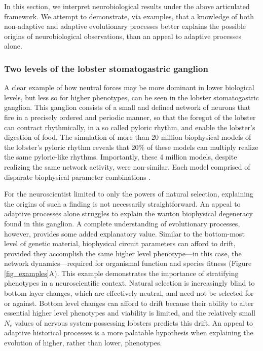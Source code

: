 \documentclass[twocolumn]{article}
\begin{document}
In this section, we interpret neurobiological results under the above articulated framework. We attempt to demonstrate, via examples, that a knowledge of both non-adaptive and adaptive evolutionary processes better explains the possible origins of neurobiological observations, than an appeal to adaptive processes alone. 

\subsubsection{Two levels of the lobster stomatogastric ganglion}

A clear example of how neutral forces may be more dominant in lower biological levels, but less so for higher phenotypes, can be seen in the lobster stomatogastric ganglion. This ganglion consists of a small and defined network of neurons that fire in a precisely ordered and periodic manner, so that the foregut of the lobster can contract rhythmically, in a so called pyloric rhythm, and enable the lobster's digestion of food. The simulation of more than 20 million biophysical models of the lobster's pyloric rhythm reveals that 20\% of these models can multiply realize the same pyloric-like rhythms. Importantly, these 4 million models, despite realizing the same network activity, were non-similar. Each model comprised of disparate biophysical parameter combinations \cite{prinz_marder_2004}.

For the neuroscientist limited to only the powers of natural selection, explaining the origins of such a finding is not necessarily straightforward. An appeal to adaptive processes alone struggles to explain the wanton biophysical degeneracy found in this ganglion. A complete understanding of evolutionary processes, however, provides some added explanatory value. Similar to the bottom-most level of genetic material, biophysical circuit parameters can afford to drift, provided they accomplish the same higher level phenotype---in this case, the network dynamics---required for organismal function and species fitness (Figure \ref{fig_examples}A). This example demonstrates the importance of stratifying phenotypes in a neuroscientific context. Natural selection is increasingly blind to bottom layer changes, which are effectively neutral, and need not be selected for or against. Bottom level changes can afford to drift because their ability to alter essential higher level phenotypes and viability is limited, and the relatively small $N_e$ values of nervous system-possessing lobsters predicts this drift. An appeal to adaptive historical processes is a more palatable hypothesis when explaining the evolution of higher, rather than lower, phenotypes.
\end{document}
